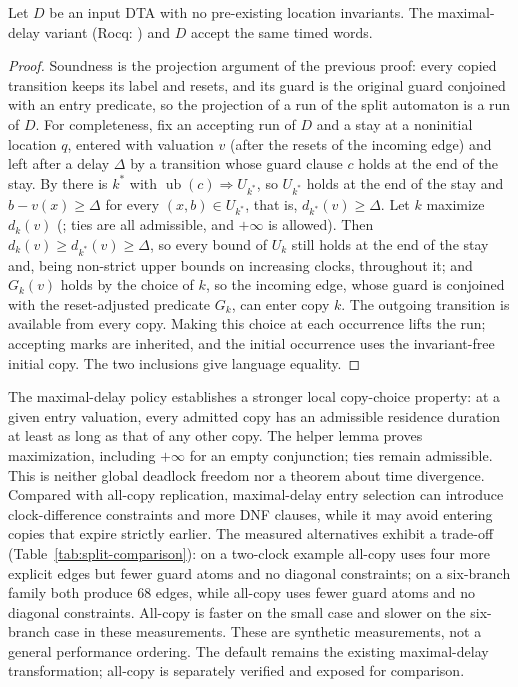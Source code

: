 \begin{theorem}
Let $D$ be an input DTA with no pre-existing location invariants. The
maximal-delay variant (Rocq: ) and $D$ accept the same timed words.
\end{theorem}
\begin{proof}
Soundness is the projection argument of the previous proof: every copied transition keeps its
label and resets, and its guard is the original guard conjoined with an entry predicate, so
the projection of a run of the split automaton is a run of $D$. For completeness, fix an
accepting run of $D$ and a stay at a noninitial location $q$, entered with valuation $v$
(after the resets of the incoming edge) and left after a delay $\Delta$ by a transition whose guard
clause $c$ holds at the end of the stay. By  there is $k^*$ with
$\operatorname{ub}(c)\Rightarrow U_{k^*}$, so $U_{k^*}$ holds at the end of the stay and
$b-v(x)\ge\Delta$ for every $(x,b)\in U_{k^*}$, that is, $d_{k^*}(v)\ge\Delta$. Let $k$ maximize $d_k(v)$
(; ties are all admissible, and $+\infty$ is allowed). Then $d_k(v)\ge d_{k^*}(v)\ge\Delta$,
so every bound of $U_k$ still holds at the end of the stay and, being non-strict upper bounds on increasing
clocks, throughout it; and $G_k(v)$ holds by the choice of $k$, so the incoming edge, whose guard is conjoined with the
reset-adjusted predicate $G_k$, can enter copy $k$. The outgoing transition is available from every
copy. Making this choice at each occurrence lifts the run; accepting marks are inherited, and
the initial occurrence uses the invariant-free initial copy. The two inclusions give language equality.
\end{proof}

The maximal-delay policy establishes a stronger local copy-choice property:
at a given entry valuation, every admitted copy has an admissible residence
duration at least as long as that of any other copy. The helper lemma
 proves maximization, including $+\infty$ for an empty
conjunction; ties remain admissible. This is neither global deadlock
freedom nor a theorem about time divergence. Compared with all-copy
replication, maximal-delay entry selection can introduce clock-difference
constraints and more DNF clauses, while it may avoid entering copies that
expire strictly earlier. The measured alternatives exhibit a trade-off
(Table~\ref{tab:split-comparison}): on a two-clock example all-copy uses four
more explicit edges but fewer guard atoms and no diagonal constraints; on a
six-branch family both produce 68 edges, while all-copy uses fewer guard
atoms and no diagonal constraints. All-copy is faster on the small case and
slower on the six-branch case in these measurements. These are synthetic
measurements, not a general performance ordering. The default remains the existing
maximal-delay transformation; all-copy is separately verified and exposed
for comparison.


